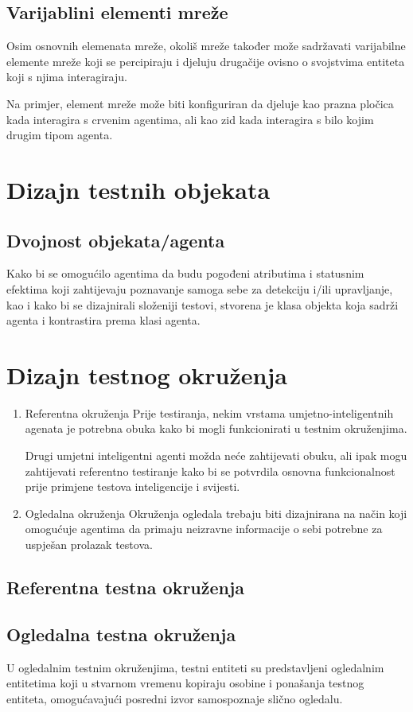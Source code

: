 \documentclass[diplomskirad]{fer}
\begin{document}
\subsection{Varijablini elementi mreže}
Osim osnovnih elemenata mreže, okoliš mreže također može sadržavati varijabilne elemente mreže koji se percipiraju i djeluju drugačije ovisno o svojstvima entiteta koji s njima interagiraju.

Na primjer, element mreže može biti konfiguriran da djeluje kao prazna pločica kada interagira s crvenim agentima, ali kao zid kada interagira s bilo kojim drugim tipom agenta.

\section{Dizajn testnih objekata}
\subsection{Dvojnost objekata/agenta}
Kako bi se omogućilo agentima da budu pogođeni atributima i statusnim efektima koji zahtijevaju poznavanje samoga sebe za detekciju i/ili upravljanje, kao i kako bi se dizajnirali složeniji testovi, stvorena je klasa objekta koja sadrži agenta i kontrastira prema klasi agenta.

\section{Dizajn testnog okruženja}
\begin{enumerate}
\item Referentna okruženja
Prije testiranja, nekim vrstama umjetno-inteligentnih agenata je potrebna obuka kako bi mogli funkcionirati u testnim okruženjima.

Drugi umjetni inteligentni agenti možda neće zahtijevati obuku, ali ipak mogu zahtijevati referentno testiranje kako bi se potvrdila osnovna funkcionalnost prije primjene testova inteligencije i svijesti.

\item Ogledalna okruženja
Okruženja ogledala trebaju biti dizajnirana na način koji omogućuje agentima da primaju neizravne informacije o sebi potrebne za uspješan prolazak testova.
\end{enumerate}
\subsection{Referentna testna okruženja}
\subsection{Ogledalna testna okruženja}
U ogledalnim testnim okruženjima, testni entiteti su predstavljeni ogledalnim entitetima koji u stvarnom vremenu kopiraju osobine i ponašanja testnog entiteta, omogućavajući posredni izvor samospoznaje slično ogledalu.
\end{document}
